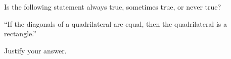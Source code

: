Is the following statement always true, sometimes true, or never true?

\begin{center}``If the diagonals of a quadrilateral are equal, then the quadrilateral is a rectangle.''\end{center}

Justify your answer.
